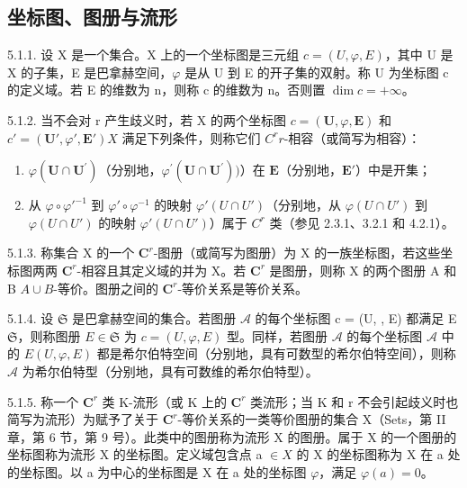 \subsection{坐标图、图册与流形}

5.1.1. 设 X 是一个集合。X 上的一个坐标图是三元组 \(c = (U, \varphi, E)\)，其中 U 是 X 的子集，E 是巴拿赫空间，\(\varphi\) 是从 U 到 E 的开子集的双射。称 U 为坐标图 c 的定义域。若 E 的维数为 n，则称 c 的维数为 n。否则置 \(\dim c = +\infty\)。

5.1.2. 当不会对 r 产生歧义时，若 X 的两个坐标图 \(c = (\mathbf{U}, \varphi, \mathbf{E})\) 和 \(c' = (\mathbf{U}', \varphi', \mathbf{E}')\)\(X\) 满足下列条件，则称它们 \(C^r\)\(r\)-相容（或简写为相容）：

\begin{enumerate}
\def\labelenumi{(\alph{enumi})}
\item
  \(\varphi (\mathbf{U}\cap \mathbf{U}^{\prime})\)（分别地，\(\varphi^{\prime}(\mathbf{U}\cap \mathbf{U}^{\prime}))\)）在 \(\mathbf{E}\)（分别地，\(\mathbf{E}'\)）中是开集；
\item
  从 \(\varphi \circ \varphi'^{-1}\) 到 \(\varphi' \circ \varphi^{-1}\) 的映射 \(\varphi'(U \cap U')\)（分别地，从 \(\varphi(U \cap U')\) 到 \(\varphi(U \cap U')\) 的映射 \(\varphi'(U \cap U')\)）属于 \(C^r\) 类（参见 2.3.1、3.2.1 和 4.2.1）。
\end{enumerate}

5.1.3. 称集合 X 的一个 \(\mathbf{C}^{r}\)-图册（或简写为图册）为 X 的一族坐标图，若这些坐标图两两 \(\mathbf{C}^{r}\)-相容且其定义域的并为 X。若 \(\mathbf{C}^{r}\) 是图册，则称 X 的两个图册 A 和 B \(A \cup B\)-等价。图册之间的 \(\mathbf{C}^{r}\)-等价关系是等价关系。

5.1.4. 设 \(\mathfrak{S}\) 是巴拿赫空间的集合。若图册 \(\mathcal{A}\) 的每个坐标图 c = (U, , E) 都满足 E  \(\mathfrak{S}\)，则称图册 \(E \in \mathfrak{S}\) 为 \(c = (U, \varphi, E)\) 型。同样，若图册 \(\mathcal{A}\) 的每个坐标图 \(\mathcal{A}\) 中的 \(E\)\((U, \varphi, E)\) 都是希尔伯特空间（分别地，具有可数型的希尔伯特空间），则称 \(\mathcal{A}\) 为希尔伯特型（分别地，具有可数维的希尔伯特型）。

5.1.5. 称一个 \(\mathbf{C}^{r}\) 类 K-流形（或 K 上的 \(\mathbf{C}^{r}\) 类流形；当 K 和 r 不会引起歧义时也简写为流形）为赋予了关于 \(\mathbf{C}^{r}\)-等价关系的一类等价图册的集合 X（Sets，第 II 章，第 6 节，第 9 号）。此类中的图册称为流形 X 的图册。属于 X 的一个图册的坐标图称为流形 X 的坐标图。定义域包含点 a \(\in X\) 的 X 的坐标图称为 X 在 a 处的坐标图。以 a 为中心的坐标图是 X 在 a 处的坐标图 \(\varphi\)，满足 \(\varphi(a) = 0\)。

